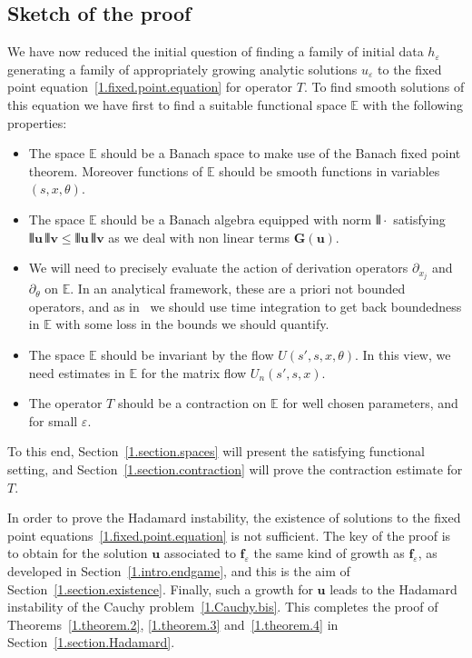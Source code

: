 \documentclass[AHL,Unicode,longabstracts,published]{cedram}
\theoremstyle{plain}
\newcommand*\e{\varepsilon}
\newcommand{\dptl}{\partial}%
\newcommand*\EE{{\mathbb E}}
\newcommand{\ubf}{{\mathbf u}}
\newcommand{\vbf}{{\mathbf v}}
\newcommand*\f{{\mathbf f}}
\DeclarePairedDelimiter{\VERT}{|\mkern -1.6mu|\mkern -1.6mu|}{|\mkern -1.6mu|\mkern -1.6mu|}
\begin{document}
\subsection{Sketch of the proof}\label{1.subsection.sketch}

We have now reduced the initial question of finding a family of initial data $h_{\e}$ generating a family of appropriately growing analytic solutions $u_{\e}$ to the fixed point equation~\eqref{1.fixed.point.equation} for operator $T$. To find smooth solutions of this equation we have first to find a suitable functional space $\EE$ with the following properties:
\begin{itemize}

\item The space $\EE$ should be a Banach space to make use of the Banach fixed point theorem. Moreover functions of $\EE$ should be smooth functions in variables $(s,x,\theta)$.

\item The space $\EE$ should be a Banach algebra equipped with norm $\VERT{\cdot}$ satisfying $ \VERT{\ubf}\, \VERT{\vbf} \leq \VERT{\ubf}\,\VERT{\vbf} $ as we deal with non linear terms ${\mathbf G}(\ubf)$.

\item We will need to precisely evaluate the action of derivation operators $\dptl_{x_j}$ and $\dptl_{\theta}$ on $\EE$. In an analytical framework, these are a priori not bounded operators, and as in~\cite{metivier2005remarks,ukai2001boltzmann} we should use time integration to get back boundedness in $\EE$ with some loss in the bounds we should quantify.

\item The space $\EE$ should be invariant by the flow $U(s',s,x,\theta)$. In this view, we need estimates in $\EE$ for the matrix flow $U_n(s',s,x)$.

\item The operator $T$ should be a contraction on $\EE$ for well chosen parameters, and for small $\e$.
\end{itemize}

\noindent To this end, Section~\ref{1.section.spaces} will present the satisfying functional setting, and Section~\ref{1.section.contraction} will prove the contraction estimate for $T$.

In order to prove the Hadamard instability, the existence of solutions to the fixed point equations~\eqref{1.fixed.point.equation} is not sufficient. The key of the proof is to obtain for the solution $\ubf$ associated to $\f_{\e}$ the same kind of growth as $\f_{\e}$, as developed in Section~\ref{1.intro.endgame}, and this is the aim of Section~\ref{1.section.existence}. Finally, such a growth for $\ubf$ leads to the Hadamard instability of the Cauchy problem~\eqref{1.Cauchy.bis}. This completes the proof of Theorems~\ref{1.theorem.2}, \ref{1.theorem.3} and~\ref{1.theorem.4} in Section~\ref{1.section.Hadamard}.
\end{document}
